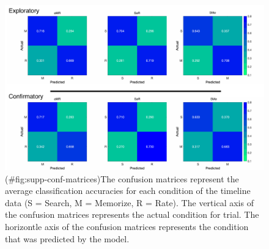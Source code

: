 \begin{appendix}
\begin{figure}
\centering
\includegraphics{supplementary_analysis/confusion_matrices/supp_conf_matrices.pdf}
\caption{(\#fig:supp-conf-matrices)The confusion matrices represent the
average classification accuracies for each condition of the timeline
data (S = Search, M = Memorize, R = Rate). The vertical axis of the
confusion matrices represents the actual condition for trial. The
horizontle axis of the confusion matrices represents the condition that
was predicted by the model.}
\end{figure}
\end{appendix}
